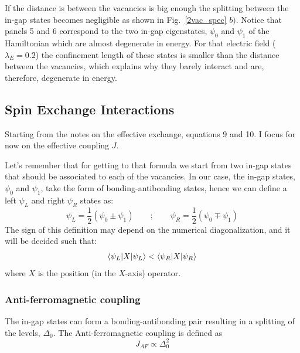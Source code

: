 If the distance is between the vacancies is big enough the splitting between the in-gap states becomes negligible as shown in Fig.~\ref{2vac_spec} $b)$. Notice that panels 5 and 6 correspond to the two in-gap eigenstates, $\psi_0$ and $\psi_1$ of the Hamiltonian which are almost degenerate in energy. For that electric field ($\lambda_E=0.2$) the confinement length of these states is smaller than the distance between the vacancies, which explains why they barely interact and are, therefore, degenerate in energy.



\subsection{Spin Exchange Interactions} %
Starting from the notes on the effective exchange, equations 9 and 10. I focus for now on the effective coupling $J$.

Let's remember that for getting to that formula we start from two in-gap states that should be associated to each of the vacancies.
In our case, the in-gap states, $\psi_0$ and $\psi_1$, take the form of bonding-antibonding states, hence we can define a left $\psi_L$ and right $\psi_R$ states as:
\begin{equation}
  \psi_L = \frac{1}{2}\left(\psi_0 \pm \psi_1\right) \quad\quad;\quad\quad
  \psi_R = \frac{1}{2}\left(\psi_0 \mp \psi_1\right)
\end{equation}
The sign of this definition may depend on the numerical diagonalization, and it will be decided such that:
\begin{equation*}
  \langle\psi_L|X|\psi_L\rangle < \langle\psi_R|X|\psi_R\rangle
\end{equation*}
where $X$ is the position (in the $X$-axis) operator.


\subsubsection{Anti-ferromagnetic coupling}
The in-gap states can form a bonding-antibonding pair resulting in a splitting of the levels, $\Delta_0$. The Anti-ferromagnetic coupling is defined as
\begin{equation}
  J_{AF} \propto \Delta^2_0     %
\end{equation}


